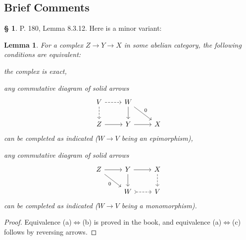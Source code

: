 \documentclass[12pt]{article}%
\newtheorem{lem}[thm]{Lemma}
\theoremstyle{remark}
\theoremstyle{definition}
\newtheorem{s}[thm]{\S}%
\newcommand{\nn}{\noindent}
\newcommand{\ssi}{\Leftrightarrow}%
\begin{document}
\subsection{Brief Comments}
%
\begin{s}
P. 180, Lemma 8.3.12. Here is a minor variant:
%
\begin{lem}\label{8312}
For a complex $Z\to Y\to X$ in some abelian category, the following conditions are equivalent:

\nn{\em(a)} the complex is exact,

\nn{\em(b)} any commutative diagram of solid arrows
$$
\begin{tikzcd}
V\ar[dashed]{d}\ar[dashed]{r}&W\ar{dr}{0}\ar{d}\\ 
Z\ar{r}&Y\ar{r}&X
\end{tikzcd}
$$ 
can be completed as indicated ($W\to V$ being an epimorphism),

\nn{\em(c)} any commutative diagram of solid arrows
$$
\begin{tikzcd}
Z\ar{dr}[swap]{0}\ar{r}&Y\ar{d}\ar{r}&X\ar[dashed]{d}\\ 
{}&W\ar[tail,dashed]{r}&V
\end{tikzcd}
$$ 
can be completed as indicated ($W\to V$ being a monomorphism).
\end{lem}
%
\begin{proof}
Equivalence (a)$\ssi$(b) is proved in the book, and equivalence (a)$\ssi$(c) follows by reversing arrows.
\end{proof}
\end{s}
%
%
\end{document}
